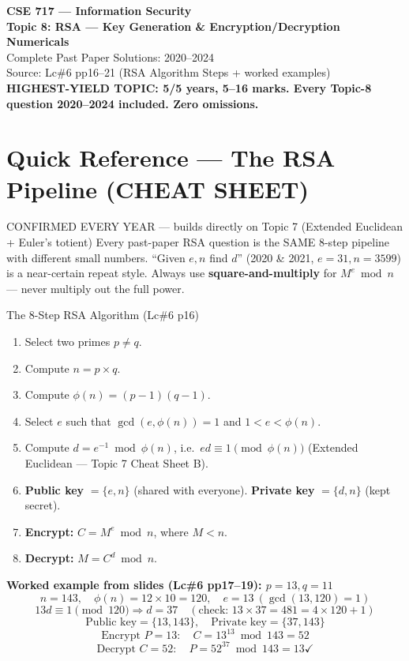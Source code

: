 \documentclass[12pt,a4paper]{article}
\begin{document}
\begin{center}
{\LARGE\bfseries\color{folblue} CSE 717 --- Information Security}\\[4pt]
{\large\bfseries Topic 8: RSA --- Key Generation \& Encryption/Decryption Numericals}\\[2pt]
{\large Complete Past Paper Solutions: 2020--2024}\\[6pt]
{\normalsize Source: Lc\#6 pp16--21 (RSA Algorithm Steps + worked examples)}\\[2pt]
{\normalsize\color{darkred}\textbf{HIGHEST-YIELD TOPIC: 5/5 years, 5--16 marks. Every Topic-8 question 2020--2024 included. Zero omissions.}}
\end{center}

\tableofcontents

\section*{Quick Reference --- The RSA Pipeline (CHEAT SHEET)}

\begin{warnbox}{CONFIRMED EVERY YEAR --- builds directly on Topic 7 (Extended Euclidean + Euler's totient)}
Every past-paper RSA question is the SAME 8-step pipeline with different small numbers. ``Given $e,n$ find $d$'' (2020 \& 2021, $e=31,n=3599$) is a near-certain repeat style. Always use \textbf{square-and-multiply} for $M^e \bmod n$ --- never multiply out the full power.
\end{warnbox}

\begin{algobox}{The 8-Step RSA Algorithm (Lc\#6 p16)}
\begin{enumerate}[noitemsep]
  \item Select two primes $p \neq q$.
  \item Compute $n = p \times q$.
  \item Compute $\phi(n) = (p-1)(q-1)$.
  \item Select $e$ such that $\gcd(e,\phi(n))=1$ and $1 < e < \phi(n)$.
  \item Compute $d = e^{-1} \bmod \phi(n)$, i.e.\ $ed \equiv 1 \pmod{\phi(n)}$ (Extended Euclidean --- Topic 7 Cheat Sheet B).
  \item \textbf{Public key} $= \{e,n\}$ (shared with everyone). \textbf{Private key} $= \{d,n\}$ (kept secret).
  \item \textbf{Encrypt:} $C = M^e \bmod n$, where $M < n$.
  \item \textbf{Decrypt:} $M = C^d \bmod n$.
\end{enumerate}

\textbf{Worked example from slides (Lc\#6 pp17--19): $p=13,q=11$}
\[
n=143,\quad \phi(n)=12\times10=120,\quad e=13\ (\gcd(13,120)=1)
\]
\[
13d \equiv 1 \pmod{120} \Rightarrow d=37 \quad(\text{check: } 13\times37=481=4\times120+1)
\]
\[
\text{Public key}=\{13,143\},\quad\text{Private key}=\{37,143\}
\]
\[
\text{Encrypt } P=13:\quad C=13^{13}\bmod143=52
\]
\[
\text{Decrypt } C=52:\quad P=52^{37}\bmod143=13 \checkmark
\]
\end{algobox}
\end{document}

